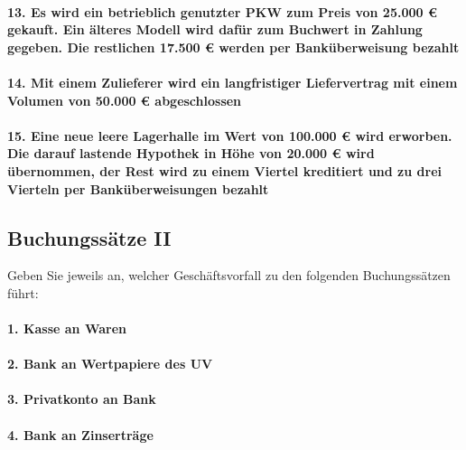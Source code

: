 \documentclass[paper=a4, fontsize=11pt]{scrartcl}
\numberwithin{equation}{section}
\numberwithin{figure}{section}
\numberwithin{table}{section}
\begin{document}
\paragraph{13. Es wird ein betrieblich genutzter PKW zum Preis von 25.000 € gekauft. Ein älteres Modell wird dafür zum Buchwert in Zahlung gegeben. Die restlichen 17.500 € werden per Banküberweisung bezahlt}

\paragraph{14. Mit einem Zulieferer wird ein langfristiger Liefervertrag mit einem Volumen von 50.000 € abgeschlossen}

\paragraph{15. Eine neue leere Lagerhalle im Wert von 100.000 € wird erworben. Die darauf lastende Hypothek in Höhe von 20.000 € wird übernommen, der Rest wird zu einem Viertel kreditiert und zu drei Vierteln per Banküberweisungen bezahlt}


\subsection{Buchungssätze II}

Geben Sie jeweils an, welcher Geschäftsvorfall zu den folgenden Buchungssätzen führt: \\

\paragraph{1. Kasse an Waren}

\paragraph{2. Bank an Wertpapiere des UV}

\paragraph{3. Privatkonto an Bank}

\paragraph{4. Bank an Zinserträge}
\end{document}
